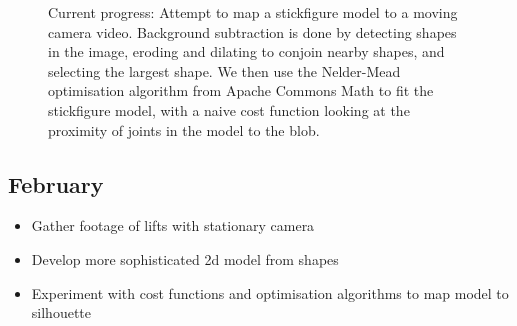 \begin{figure}[H]
    \centering
\caption{Current progress: Attempt to map a stickfigure model to a moving camera video. Background subtraction is done by detecting shapes in the image, eroding and dilating to conjoin nearby shapes, and selecting the largest shape. We then use the Nelder-Mead optimisation algorithm from Apache Commons Math to fit the stickfigure model, with a naive cost function looking at the proximity of joints in the model to the blob.}
\label{fig:currentprogress}
\end{figure}


\subsection{February}

\begin{itemize}
	\item Gather footage of lifts with stationary camera
	\item Develop more sophisticated 2d model from shapes
	\item Experiment with cost functions and optimisation algorithms to map model to silhouette
\end{itemize}

